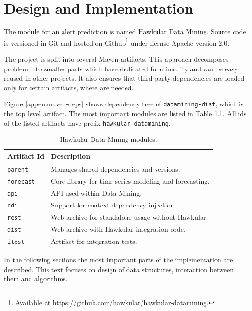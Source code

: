 \chapter{Design and Implementation} \label{chap:design-impl}
The module for an alert prediction is named Hawkular Data Mining. Source code is versioned in Git and
hosted on Github\footnote{Available at \url{https://github.com/hawkular/hawkular-datamining}.} under
license Apache version 2.0.

The project is split into several Maven artifacts. This approach decomposes problem into smaller parts
which have dedicated functionality and can be easy reused in other projects. It also ensures that
third party dependencies are loaded only for certain artifacts, where are needed.

Figure \ref{appen:maven-deps} shows dependency tree of \texttt{datamining-dist}, which is the top level artifact.
The most important modules are listed in Table \ref{tab:datamining-modules}. All ids of the listed artifacts have prefix
\texttt{hawkular-datamining}.

\begin{table}[h]
    \begin{center}
        \begin{tabular}{l|l}
            \textbf{Artifact Id} & \textbf{Description} \\ \hline \hline
            \texttt{parent} & Manages shared dependencies and versions. \\
            \texttt{forecast} & Core library for time series modeling and forecasting. \\
            \texttt{api} & API used within Data Mining. \\
            \texttt{cdi} & Support for context dependency injection. \\
            \texttt{rest} & Web archive for standalone usage without Hawkular. \\
            \texttt{dist} & Web archive with Hawkular integration code. \\
            \texttt{itest} & Artifact for integration tests.
        \end{tabular}
        \caption{Hawkular Data Mining modules.}
        \label{tab:datamining-modules}
    \end{center}
\end{table}

In the following sections the most important parts of the implementation are described. This text focuses on
design of data structures, interaction between them and algorithms.

